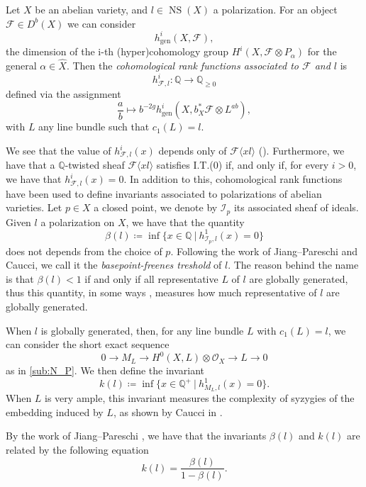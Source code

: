 \documentclass[11pt,letter]{amsart}
\numberwithin{equation}{section}
\begin{document}
Let $X$ be an abelian variety, and $l\in\operatorname{NS}(X)$ a polarization. 
For an object $\mathcal{F}\in D^b(X)$  we can consider
$$
h^i_{\text{gen}}(X,\mathcal{F}),
$$
the dimension of the i-th (hyper)cohomology group $H^i(X,\mathcal{F}\otimes P_  \alpha)$ for the general $  \alpha\in\hat{X}$. Then the \emph{cohomological rank functions associated to $\mathcal{F}$ and $l$} is 
$$h^i_{\mathcal{F},l}:\mathbb{Q}\rightarrow\mathbb{Q}_{\ge 0}$$ defined via the assignment
$$\frac{a}{b}\mapsto b^{-2g}h^i_{\text{gen}}(X,b_X^*\mathcal{F}\otimes L^{ab}),$$
with $L$ any line bundle such that $c_1(L)=l$.\par
We see that the value of $h^i_{\mathcal{F},l}(x)$ depends only of $\mathcal{F}\langle xl\rangle$ (\cite[Remark 2.2]{JiPa2020}). Furthermore, we have that a $\mathbb{Q}$-twisted sheaf $\mathcal{F}\langle xl\rangle$ satisfies I.T.(0) if, and only if, for every $i>0$, we have that $h^i_{\mathcal{F},l}(x)=0$. In addition to this, cohomological rank functions have been used to define invariants associated to polarizations of abelian varieties. Let $p\in X$ a closed point, we denote by $\mathcal{I}_p$ its associated sheaf of ideals. Given $l$ a polarization on $X$, we have that the quantity
\[\beta(l)\coloneqq\operatorname{inf}\{x\in\mathbb{Q}\:|\: h^1_{\mathcal{I}_p,l}(x)=0\}\]
does not depends from the choice of $p$. Following the work of Jiang--Pareschi and Caucci, we call it the \emph{basepoint-freenes treshold} of $l$. The reason behind the name is that $\beta(l)<1$ if and only if all representative $L$ of $l$
 are globally generated, thus this quantity, in some ways , measures how much representative of $l$ are globally generated.\par
 When $l$ is globally generated, then, for any line bundle $L$ with $c_1(L)=l$, we can consider the short exact sequence
 \begin{equation}\label{sesimportant}
     0\rightarrow M_L\longrightarrow H^0(X,L)\otimes\mathcal{O}_X\longrightarrow L\rightarrow 0
 \end{equation}
 as in \ref{sub:N_P}. We then define the invariant
 \[
 k(l)\coloneqq \inf\{x\in\mathbb{Q}^+\:|\: h^1_{M_L,l}(x)=0\}.
 \]
 When $L$ is very ample, this invariant measures the complexity of syzygies of the embedding induced by $L$, as shown by Caucci in \cite{Caucci}.\par
 By the work of Jiang--Pareschi \cite[Thm. D]{JiPa2020}, we have that the invariants $\beta(l)$ and $k(l)$ are related by the following equation
 \begin{equation}\label{eq:kappabeta}
     k(l)=\frac{\beta(l)}{1-\beta(l)}.
 \end{equation}
  
\end{document}
